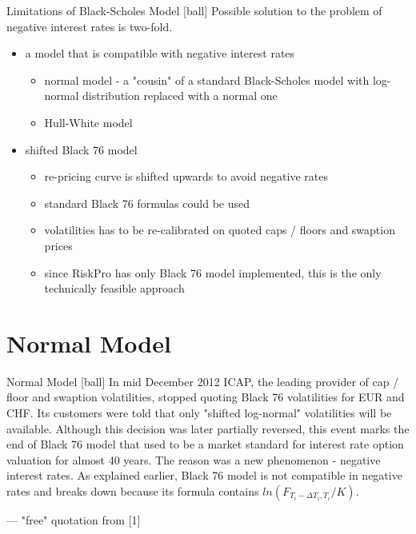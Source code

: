 \documentclass{beamer}
\begin{document}
\begin{frame}{Limitations of Black-Scholes Model}
[ball]
Possible solution to the problem of negative interest rates is two-fold.
\begin{itemize}
\item a model that is compatible with negative interest rates
	\begin{itemize}
	\item normal model - a "cousin" of a standard Black-Scholes model with log-normal distribution replaced with a normal one
	\item Hull-White model
	\end{itemize}
\item shifted Black 76 model
	\begin{itemize}
	\item re-pricing curve is shifted upwards to avoid negative rates
	\item standard Black 76 formulas could be used
	\item volatilities has to be re-calibrated on quoted caps / floors and swaption prices
	\item since RiskPro has only Black 76 model implemented, this is the only technically feasible approach
	\end{itemize}
\end{itemize}
\end{frame}

\section{Normal Model}

\begin{frame}{Normal Model}
[ball]
In mid December 2012 ICAP, the leading provider of cap / floor and swaption volatilities, stopped quoting Black 76 volatilities for EUR and CHF. Its customers were told that only "shifted log-normal" volatilities will be available. Although this decision was later partially reversed, this event marks the end of Black 76 model that used to be a market standard for interest rate option valuation for almost 40 years. The reason was a new phenomenon - negative interest rates. As explained earlier, Black 76 model is not compatible in negative rates and breaks down because its formula contains $ln(F_{T_i - \Delta T_i, T_i}/K)$.
\par\raggedleft--- \textup{"free" quotation from [1]}
\end{frame}
\end{document}
